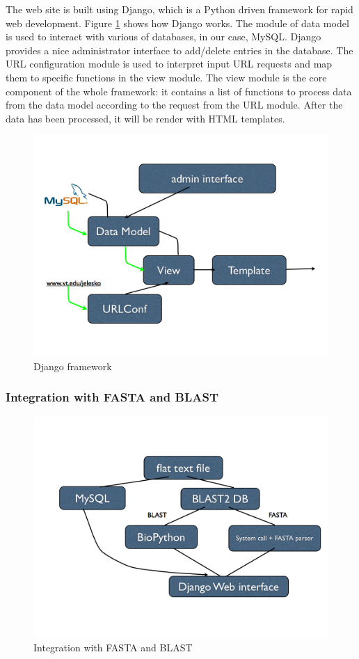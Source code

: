 \documentclass[11pt,letterpaper,twoside,english]{article}
\begin{document}
The web site is built using Django, which is a Python driven framework
for rapid web development. Figure \ref{fig:Django-framework} shows
how Django works. The module of data model is used to interact with
various of databases, in our case, MySQL. Django provides a nice administrator
interface to add/delete entries in the database. The URL configuration
module is used to interpret input URL requests and map them to specific
functions in the view module. The view module is the core component
of the whole framework: it contains a list of functions to process
data from the data model according to the request from the URL module.
After the data has been processed, it will be render with HTML templates.

%
\begin{figure}[h]
\begin{centering}
\includegraphics[width=0.6\linewidth]{figures/Django}
\par\end{centering}

\caption{\label{fig:Django-framework}Django framework}

\end{figure}



\subsubsection{\label{sub:Integration-with-FASTA}Integration with FASTA and BLAST}

%
\begin{figure}[H]
\begin{centering}
\includegraphics[width=0.7\linewidth]{figures/Data_flow}
\par\end{centering}

\caption{\label{fig:Integration-with-FASTA}Integration with FASTA and BLAST}

\end{figure}
\end{document}

